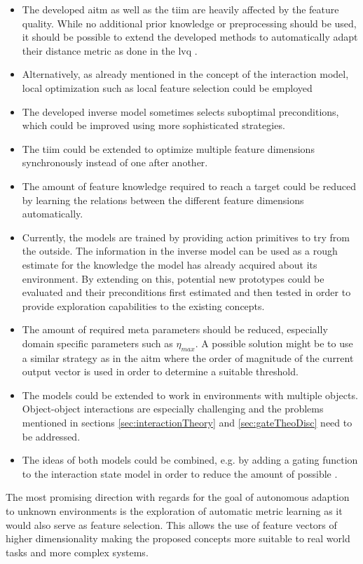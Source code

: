 \begin{itemize}
\item The developed \gls{aitm} as well as the \gls{tiim} are heavily affected by the feature quality. While no additional prior knowledge or preprocessing should be used, it should be possible to extend the developed methods to automatically adapt their distance metric as done in the \gls{lvq} \cite{lvq}.
\item Alternatively, as already mentioned in the concept of the interaction model, local optimization such as local feature selection could be employed
\item The developed inverse model sometimes selects suboptimal preconditions, which could be improved using more sophisticated strategies.
\item The \gls{tiim} could be extended to optimize multiple feature dimensions synchronously instead of one after another.
\item The amount of feature knowledge required to reach a target could be reduced by learning the relations between the different feature dimensions automatically.
\item Currently, the models are trained by providing action primitives to try from the outside. The information in the inverse model can be used as a rough estimate for the knowledge the model has already acquired about its environment. By extending on this, potential new prototypes could be evaluated and their preconditions first estimated and then tested in order to provide exploration capabilities to the existing concepts.
\item The amount of required meta parameters should be reduced, especially domain specific parameters such as $\eta_{max}$. A possible solution might be to use a similar strategy as in the \gls{aitm} where the order of magnitude of the current output vector is used in order to determine a suitable threshold.
\item The models could be extended to work in environments with multiple objects. Object-object interactions are especially challenging and the problems mentioned in sections \ref{sec:interactionTheory} and \ref{sec:gateTheoDisc} need to be addressed.
\item The ideas of both models could be combined, e.g. by adding a gating function to the interaction state model in order to reduce the amount of possible .
\end{itemize}

The most promising direction with regards for the goal of autonomous adaption to unknown environments is the exploration of automatic metric learning as it would also serve as feature selection. This allows the use of feature vectors of higher dimensionality making the proposed concepts more suitable to real world tasks and more complex systems.

